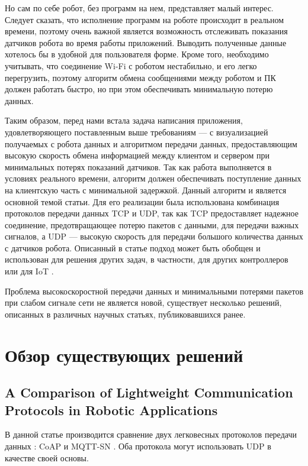 \documentclass[conference]{IEEEtran}
\begin{document}
Но сам по себе робот, без программ на нем, представляет малый интерес. Следует сказать, что исполнение программ на роботе происходит в реальном времени, поэтому очень важной является возможность отслеживать показания датчиков робота во время работы приложений. Выводить полученные данные хотелось бы в удобной для пользователя форме.
Кроме того, необходимо учитывать, что соединение Wi-Fi с роботом нестабильно, и его легко перегрузить, поэтому алгоритм обмена сообщениями между роботом и ПК должен работать быстро, но при этом обеспечивать минимальную потерю данных.


Таким образом, перед нами встала задача написания приложения, удовлетворяющего поставленным выше требованиям --- с визуализацией получаемых с робота данных и алгоритмом передачи данных, предоставляющим высокую скорость обмена информацией между клиентом и сервером при минимальных потерях показаний датчиков. Так как работа выполняется в условиях реального времени, алгоритм должен обеспечивать поступление данных на клиентскую часть с минимальной задержкой. Данный алгоритм и является основной темой статьи. Для его реализации была использована комбинация протоколов передачи данных TCP и UDP, так как TCP предоставляет надежное соединение, предотвращающее потерю пакетов с данными, для передачи важных сигналов, а UDP --- высокую скорость для передачи большого количества данных с датчиков робота. Описанный в статье подход может быть обобщен и использован для решения других задач, в частности, для других контроллеров или для IoT \cite{IOT}.


Проблема высокоскоростной передачи данных и минимальными потерями пакетов при слабом сигнале сети не является новой, существует несколько решений, описанных в различных научных статьях, публиковавшихся ранее.

\section{Обзор существующих решений}

\subsection{A Comparison of Lightweight Communication Protocols in Robotic Applications}

В данной статье \cite{paper1} производится сравнение двух легковесных протоколов передачи данных : CoAP \cite{coap} и MQTT-SN \cite{mqtt}.
Оба протокола могут использовать UDP в качестве своей основы. 
\end{document}
